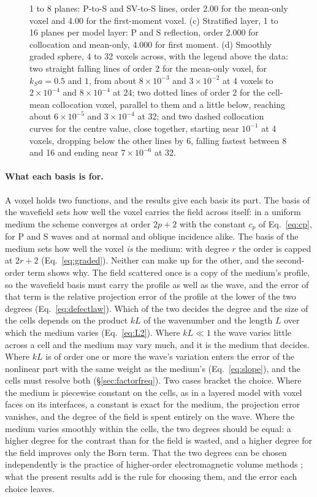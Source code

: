 \documentclass[11pt,a4paper]{article}
\begin{document}
\begin{figure}[t]
{1 to 8 planes: P-to-S and SV-to-S lines, order 2.00 for the mean-only voxel and 4.00 for the
first-moment voxel. (c) Stratified layer, 1 to 16 planes per model layer: P and S reflection, order 2.000
for collocation and mean-only, 4.000 for first moment. (d) Smoothly graded sphere, 4 to 32 voxels across,
with the legend above the data: two straight falling lines of order 2 for the mean-only voxel, for
$k_Sa=0.5$ and $1$, from about $8\times10^{-3}$ and $3\times10^{-2}$ at 4 voxels to $2\times10^{-4}$
and $8\times10^{-4}$ at 24; two dotted lines of order 2 for the cell-mean collocation voxel, parallel to
them and a little below, reaching about $6\times10^{-5}$ and $3\times10^{-4}$ at 32; and two dashed
collocation curves for the centre value, close together, starting near $10^{-1}$ at 4 voxels, dropping
below the other lines by 6, falling fastest between 8 and 16 and ending near $7\times10^{-6}$ at 32.\par}
\end{figure}

\paragraph{What each basis is for.} A voxel holds two functions, and the results give each basis its
part. The basis of the wavefield sets how well the voxel carries the field across itself: in a uniform
medium the scheme converges at order $2p+2$ with the constant $c_p$ of Eq.~\eqref{eq:cp}, for P and S
waves and at normal and oblique incidence alike. The basis of the medium sets how well the voxel
\emph{is} the medium: with degree $r$ the order is capped at $2r+2$ (Eq.~\eqref{eq:graded}). Neither can
make up for the other, and the second-order term shows why. The field scattered once is a copy of the
medium's profile, so the wavefield basis must carry the profile as well as the wave, and the error of
that term is the relative projection error of the profile at the lower of the two degrees
(Eq.~\eqref{eq:defectlaw}). Which of the two decides the degree and the size of the cells depends on
the product $kL$ of the wavenumber and the length $L$ over which the medium varies
(Eq.~\eqref{eq:L2}). Where $kL\ll1$ the wave varies little across a cell and the medium may vary much, and
it is the medium that decides. Where $kL$ is of order one or more the wave's variation enters the error of
the nonlinear part with the same weight as the medium's (Eq.~\eqref{eq:slope}), and the cells must resolve
both (\S\ref{sec:factorfreq}). Two cases bracket the choice. Where the medium is piecewise constant on the cells, as in a
layered model with voxel faces on its interfaces, a constant is exact for the medium, the projection
error vanishes, and the degree of the field is spent entirely on the wave. Where the medium varies
smoothly within the cells, the two degrees should be equal: a higher degree for the contrast than for
the field is wasted, and a higher degree for the field improves only the Born term. That the two
degrees can be chosen independently is the practice of higher-order electromagnetic volume methods
\citep{Chobanyan2015}; what the present results add is the rule for choosing them, and the error each
choice leaves.
\end{document}
